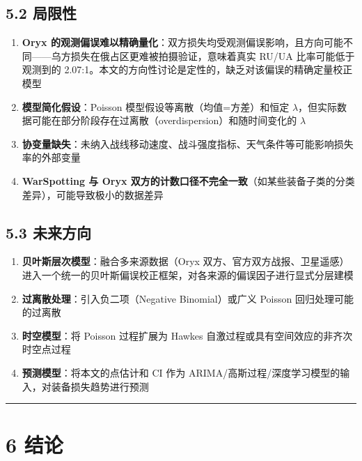 \documentclass[
  a4paper,
  fontset=none,
]{ctexart}
\providecommand{\tightlist}{%
  \setlength{\itemsep}{0pt}\setlength{\parskip}{0pt}}
\begin{document}
\hypertarget{ux5c40ux9650ux6027}{%
\subsection{5.2 局限性}\label{ux5c40ux9650ux6027}}

\begin{enumerate}
\def\labelenumi{\arabic{enumi}.}
\tightlist
\item
  \textbf{Oryx
  的观测偏误难以精确量化}：双方损失均受观测偏误影响，且方向可能不同------乌方损失在俄占区更难被拍摄验证，意味着真实
  RU/UA 比率可能低于观测到的
  2.07:1。本文的方向性讨论是定性的，缺乏对该偏误的精确定量校正模型
\item
  \textbf{模型简化假设}：Poisson 模型假设等离散（均值=方差）和恒定
  \(\lambda\)，但实际数据可能在部分阶段存在过离散（overdispersion）和随时间变化的
  \(\lambda\)
\item
  \textbf{协变量缺失}：未纳入战线移动速度、战斗强度指标、天气条件等可能影响损失率的外部变量
\item
  \textbf{WarSpotting 与 Oryx
  双方的计数口径不完全一致}（如某些装备子类的分类差异），可能导致极小的数据差异
\end{enumerate}

\hypertarget{ux672aux6765ux65b9ux5411}{%
\subsection{5.3 未来方向}\label{ux672aux6765ux65b9ux5411}}

\begin{enumerate}
\def\labelenumi{\arabic{enumi}.}
\tightlist
\item
  \textbf{贝叶斯层次模型}：融合多来源数据（Oryx
  双方、官方双方战报、卫星遥感）进入一个统一的贝叶斯偏误校正框架，对各来源的偏误因子进行显式分层建模
\item
  \textbf{过离散处理}：引入负二项（Negative Binomial）或广义 Poisson
  回归处理可能的过离散
\item
  \textbf{时空模型}：将 Poisson 过程扩展为 Hawkes
  自激过程或具有空间效应的非齐次时空点过程
\item
  \textbf{预测模型}：将本文的点估计和 CI 作为
  ARIMA/高斯过程/深度学习模型的输入，对装备损失趋势进行预测
\end{enumerate}

\begin{center}\rule{0.5\linewidth}{0.5pt}\end{center}

\hypertarget{ux7ed3ux8bba}{%
\section{6 结论}\label{ux7ed3ux8bba}}
\end{document}
